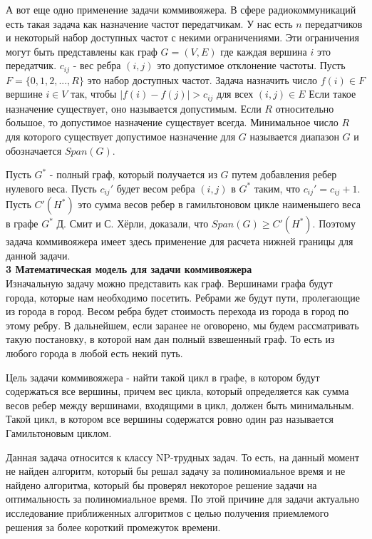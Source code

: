 \documentclass[a4paper, 14pt]{extarticle}
\begin{document}
А вот еще одно применение задачи коммивояжера. В сфере радиокоммуникаций есть такая задача как назначение частот передатчикам. У нас есть $n$ передатчиков и некоторый набор доступных частот с некими ограничениями. Эти ограничения могут быть представлены как граф $G= (V, E)$ где каждая вершина $i$ это передатчик. $c_{ij}$ - вес ребра $(i,j)$ это допустимое отклонение частоты. Пусть $F = \{ 0,1,2,...,R \}$ это набор доступных частот. Задача назначить число $f(i) \in F$ вершине $i \in V$ так, чтобы $|f(i)-f(j)| > c_{ij}$ для всех $(i,j) \in E$ Если такое назначение существует, оно называется допустимым. Если $R$ относительно большое, то допустимое назначение существует всегда. Минимальное число $R$ для которого существует допустимое назначение для $G$ называется диапазон $G$ и обозначается $Span(G)$.

Пусть $G^*$ - полный граф, который получается из $G$ путем добавления ребер нулевого веса. Пусть $c_{ij}'$ будет весом ребра $(i,j)$ в $G^*$ таким, что $c_{ij}' = c_{ij}+1$. Пусть $C'(H^*)$ это сумма весов ребер в гамильтоновом цикле наименьшего веса в графе $G^*$ Д. Смит и С. Хёрли, доказали, что $Span(G) \geq C'(H^*)$. Поэтому задача коммивояжера имеет здесь применение для расчета нижней границы для данной задачи. \\

\textbf{3 Математическая модель для задачи коммивояжера}  \\

Изначальную задачу можно представить как граф. Вершинами графа будут города, которые нам необходимо посетить. Ребрами же будут пути, пролегающие из города в город. Весом ребра будет стоимость перехода из города в город по этому ребру. В дальнейшем, если заранее не оговорено, мы будем рассматривать такую постановку, в которой нам дан полный взвешенный граф. То есть из любого города в любой есть некий путь.

Цель задачи коммивояжера - найти такой цикл в графе, в котором будут содержаться все вершины, причем вес цикла, который определяется как сумма весов ребер между вершинами, входящими в цикл, должен быть минимальным. Такой цикл, в котором все вершины содержатся ровно один раз называется Гамильтоновым циклом.

Данная задача относится к классу NP-трудных задач. То есть, на данный момент не найден алгоритм, который бы решал задачу за полиномиальное время и не найдено алгоритма, который бы проверял некоторое решение задачи на оптимальность за полиномиальное время. По этой причине для задачи актуально исследование приближенных алгоритмов с целью получения приемлемого решения за более короткий промежуток времени.
\end{document}
